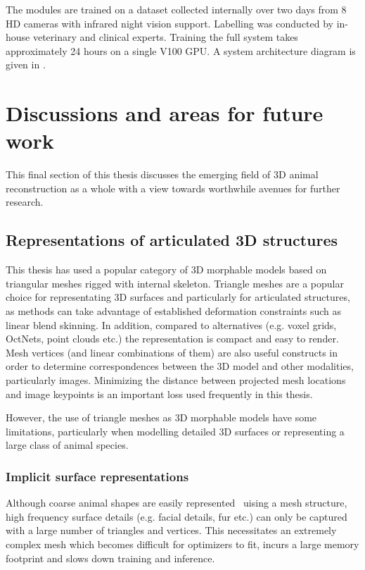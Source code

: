  The modules are trained on a dataset collected internally over two days from 8 HD cameras with infrared night vision support. Labelling was conducted by in-house veterinary and clinical experts. Training the full system takes approximately 24 hours on a single V100 GPU. A system architecture diagram is given in .




\section{Discussions and areas for future work}

This final section of this thesis discusses the emerging field of 3D animal reconstruction as a whole with a view towards worthwhile avenues for further research.

\subsection{Representations of articulated 3D structures}

This thesis has used a popular category of 3D morphable models based on triangular meshes rigged with internal skeleton. Triangle meshes are a popular choice for representating 3D surfaces and particularly for articulated structures, as methods can take advantage of established deformation constraints such as linear blend skinning. In addition, compared to alternatives (e.g. voxel grids, OctNets, point clouds etc.) the representation is compact and easy to render. Mesh vertices (and linear combinations of them) are also useful constructs in order to determine correspondences between the 3D model and other modalities, particularly images. Minimizing the distance between projected mesh locations and image keypoints is an important loss used frequently in this thesis. 

However, the use of triangle meshes as 3D morphable models have some limitations, particularly when modelling detailed 3D surfaces or representing a large class of animal species.

\subsubsection{Implicit surface representations}

Although coarse animal shapes are easily represented~\cite{} uising a mesh structure, high frequency surface details (e.g. facial details, fur etc.) can only be captured with a large number of triangles and vertices. This necessitates an extremely complex mesh which becomes difficult for optimizers to fit, incurs a large memory footprint and slows down training and inference.

